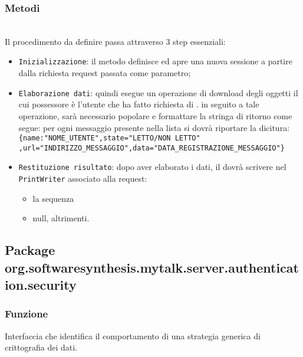 \subsubsection*{Metodi}
\begin{description}
	\item{}\\
	Il procedimento da definire passa attraverso 3 step essenziali:
	\begin{itemize}
		\item \texttt{Inizializzazione}: il metodo definisce ed apre una nuova sessione a partire dalla richiesta request passata come parametro;
		\item \texttt{Elaborazione dati}: quindi esegue un operazione di download degli oggetti  il cui possessore è l'utente che ha fatto richiesta di . in seguito a tale operazione, sarà necessario popolare e formattare la stringa di ritorno come segue: per ogni messaggio presente nella lista si dovrà riportare la dicitura:\\
		
		\verb|{name:"NOME_UTENTE",state="LETTO/NON LETTO"|\\
		\verb|,url="INDIRIZZO_MESSAGGIO",data="DATA_REGISTRAZIONE_MESSAGGIO"}|\\
	
		\item \texttt{Restituzione risultato}: dopo aver elaborato i dati, il  dovrà scrivere nel \texttt{PrintWriter} associato alla request:
			\begin{itemize}
				\item la sequenza
				\item null, altrimenti.
			\end{itemize}
	\end{itemize}

\end{description}

\subsection{Package org.softwaresynthesis.mytalk.server.authentication.security}\label{sec:authentication}


\subsubsection*{Funzione}
Interfaccia che identifica il comportamento di una strategia generica di crittografia dei dati.

